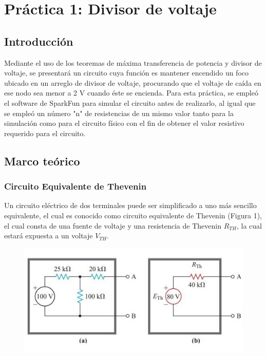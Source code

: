 \clearpage

\section{Práctica 1: Divisor de voltaje}

\subsection{Introducción}

Mediante el uso de los teoremas de máxima transferencia de potencia y divisor de voltaje, se presentará un circuito cuya función es mantener encendido un foco ubicado en un
arreglo de divisor de voltaje, procurando que el voltaje de caída en ese nodo sea menor a 2 V cuando éste se encienda. Para esta práctica, se empleó el software de SparkFun para
simular el circuito antes de realizarlo, al igual que se empleó un número "n" de resistencias de un mismo valor tanto para la simulación como para el circuito físico con el fin de
obtener el valor resistivo requerido para el circuito.

\subsection{Marco teórico}

\subsubsection{Circuito Equivalente de Thevenin}

Un circuito eléctrico de dos terminales puede ser simplificado a uno más sencillo equivalente, el cual es conocido como circuito equivalente de Thevenin (Figura 1),
el cual consta de una fuente de voltaje y una resistencia de Thevenin $R_{TH}$, la cual estará expuesta a un voltaje $V_{TH}$.

\begin{figure}
    \centering
    \includegraphics{media/CircuitoTH.jpg}
\end{figure}

